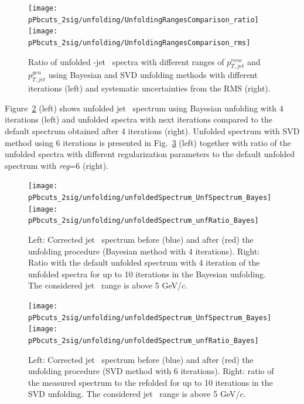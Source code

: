 \begin{figure}[bth]
\centering
\texttt{[image: pPbcuts\_2sig/unfolding/UnfoldingRangesComparison\_ratio]}
\texttt{[image: pPbcuts\_2sig/unfolding/UnfoldingRangesComparison\_rms]}
\caption{Ratio of unfolded \Dzero-jet \pt\ spectra with different ranges of $p_{T,jet}^{reco}$ and $p_{T,jet}^{gen}$ using Bayesian and SVD unfolding methods with different iterations (left) and systematic uncertainties from the RMS (right).}
\label{fig:UnfSpec_pPb_Dzero_ranges}
\end{figure}



Figure~\ref{fig:UnfSpec_pPb_Dzero_reg4} (left) shows unfolded jet \pt\ spectrum using Bayesian unfolding with 4 iterations (left) and unfolded spectra with next iterations compared to the default spectrum obtained after 4 iterations (right).
Unfolded spectrum with SVD method using 6 iterations is presented in Fig.~\ref{fig:UnfSpec_pPb_Dzero_SVD} (left) together with ratio of the unfolded spectra with different regularization parameters to the default unfolded spectrum with {\it reg}=6 (right).

\begin{figure}[bth]
\centering
\texttt{[image: pPbcuts\_2sig/unfolding/unfoldedSpectrum\_UnfSpectrum\_Bayes]}
\texttt{[image: pPbcuts\_2sig/unfolding/unfoldedSpectrum\_unfRatio\_Bayes]}
\caption{Left: Corrected jet \pt\ spectrum before (blue) and after (red) the unfolding procedure (Bayesian method with 4 iterations). Right: Ratio with the default unfolded spectrum with 4 iteration of the unfolded spectra for up to 10 iterations in the Bayesian unfolding. The considered jet \pt\ range is above 5 GeV/$c$.}
\label{fig:UnfSpec_pPb_Dzero_reg4}
\end{figure}

\begin{figure}[bth]
\centering
\texttt{[image: pPbcuts\_2sig/unfolding/unfoldedSpectrum\_UnfSpectrum\_Bayes]}
\texttt{[image: pPbcuts\_2sig/unfolding/unfoldedSpectrum\_unfRatio\_Bayes]}
\caption{Left: Corrected jet \pt\ spectrum before (blue) and after (red) the unfolding procedure (SVD method with 6 iterations). Right: ratio of the measured spectrum to the refolded for up to 10 iterations in the SVD unfolding. The considered jet \pt\ range is above 5 GeV/$c$.}
\label{fig:UnfSpec_pPb_Dzero_SVD}
\end{figure}



